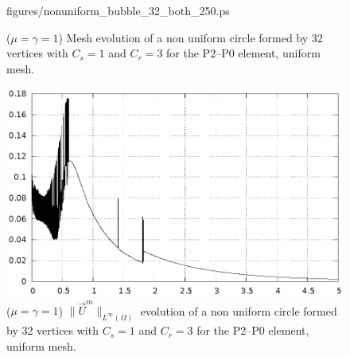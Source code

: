 \documentclass[a4paper,12pt,onecolumn]{article}
\begin{document}
\begin{figure}[htbp]
{  {figures/nonuniform_bubble_32_both_250.ps}}\quad
  \\
  \caption{($\mu=\gamma=1$) Mesh evolution of a non uniform circle formed by
32 vertices with $C_s=1$ and $C_r=3$ for the P2--P0 element, uniform mesh.}
  \label{fig:nonuniform_bubble_32_both}
\end{figure}

\begin{figure}[htbp]
  \centering
  \includegraphics[width=.45\textwidth]
  {figures/nonuniform_bubble_velocity_32_both.ps}
  \caption{($\mu=\gamma=1$) $\|\vec U^m\|_{L^\infty(\Omega)}$ evolution of a
non uniform circle formed by 32 vertices with $C_s=1$ and $C_r=3$ for the
P2--P0 element, uniform mesh.}
  \label{fig:nonuniform_bubble_velocity_32_both}
\end{figure}
\end{document}
